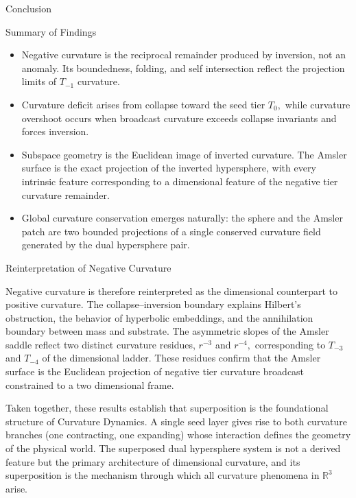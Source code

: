\documentclass[final,onefignum,onetabnum]{siamart}
\begin{document}
\begin{section}{Conclusion}
\begin{subsection}{Summary of Findings}
\begin{itemize}
    \item Negative curvature is the reciprocal remainder produced by inversion, not an anomaly. Its boundedness, folding, and self intersection reflect the projection limits of $T_{-1}$ curvature.
    \item Curvature deficit arises from collapse toward the seed tier $T_0,$ while curvature overshoot occurs when broadcast curvature exceeds collapse invariants and forces inversion.
    \item Subspace geometry is the Euclidean image of inverted curvature. The Amsler surface is the exact projection of the inverted hypersphere, with every intrinsic feature corresponding to a dimensional feature of the negative tier curvature remainder.
    \item Global curvature conservation emerges naturally: the sphere and the Amsler patch are two bounded projections of a single conserved curvature field generated by the dual hypersphere pair.
\end{itemize}
\end{subsection}

\begin{subsection}{Reinterpretation of Negative Curvature}

Negative curvature is therefore reinterpreted as the dimensional counterpart to positive curvature. The collapse–inversion boundary explains Hilbert’s obstruction, the behavior of hyperbolic embeddings, and the annihilation boundary between mass and substrate. The asymmetric slopes of the Amsler saddle reflect two distinct curvature residues, $r^{-3}$ and $r^{-4},$ corresponding to $T_{-3}$ and $T_{-4}$ of the dimensional ladder. These residues confirm that the Amsler surface is the Euclidean projection of negative tier curvature broadcast constrained to a two dimensional frame.

Taken together, these results establish that superposition is the foundational structure of Curvature Dynamics. A single seed layer gives rise to both curvature branches (one contracting, one expanding) whose interaction defines the geometry of the physical world. The superposed dual hypersphere system is not a derived feature but the primary architecture of dimensional curvature, and its superposition is the mechanism through which all curvature phenomena in $\mathbb{R}^3$ arise.


\end{subsection}
\end{section}
\end{document}
